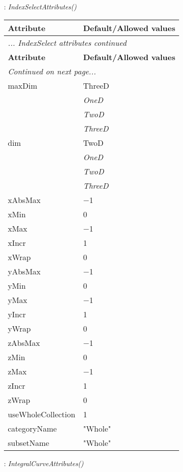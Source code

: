 \documentclass[10pt,a4paper]{report}
\begin{document}
\newpage

{}
: {\it IndexSelectAttributes() }\\[-3mm]

\begin{longtable}{ll}
{\bf Attribute} & {\bf Default/Allowed values} \\
\hline \hline
\endfirsthead
\multicolumn{2}{l}{{\it ... IndexSelect attributes continued}} \\
{\bf Attribute} & {\bf Default/Allowed values} \\
\hline \hline
\endhead
\hline
\multicolumn{2}{l}{{\it Continued on next page...}} \\
\endfoot
\hline
\endlastfoot

maxDim  &  ThreeD   \\
 & {\it  OneD} \\
 & {\it  TwoD} \\
 & {\it  ThreeD} \\
dim  &  TwoD   \\
 & {\it  OneD} \\
 & {\it  TwoD} \\
 & {\it  ThreeD} \\
xAbsMax  &  $-$1 \\
xMin  &  0 \\
xMax  &  $-$1 \\
xIncr  &  1 \\
xWrap  &  0 \\
yAbsMax  &  $-$1 \\
yMin  &  0 \\
yMax  &  $-$1 \\
yIncr  &  1 \\
yWrap  &  0 \\
zAbsMax  &  $-$1 \\
zMin  &  0 \\
zMax  &  $-$1 \\
zIncr  &  1 \\
zWrap  &  0 \\
useWholeCollection  &  1 \\
categoryName  &  "Whole" \\
subsetName  &  "Whole" \\
\end{longtable}

\newpage

{}
: {\it IntegralCurveAttributes() }\\[-3mm]
\end{document}
